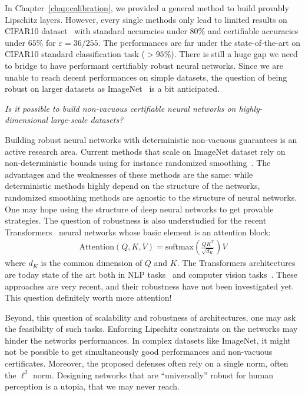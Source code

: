 In Chapter~\ref{chap:calibration}, we provided a general method to build provably Lipschitz layers. However, every single methods only lead to limited results on CIFAR10 dataset~\citep{cifar-10} with standard accuracies under $80\%$ and certifiable accuracies under $65\%$ for $\varepsilon=36/255$. The performances are far under the state-of-the-art on CIFAR10 standard classification task ($>95\%$). There is still a huge gap we need to bridge to have performant certifiably robust neural networks. Since we are unable to reach decent performances on simple datasets, the question of being robust on larger datasets as ImageNet~\citep{imagenet_cvpr09} is a bit anticipated.

\begin{tcolorbox}[colback=grund,colframe=rahmen]
    \begin{center}
        \emph{Is it possible to build non-vacuous certifiable neural networks on highly-dimensional large-scale datasets?}   
    \end{center}

\end{tcolorbox}

Building robust neural networks with deterministic non-vacuous guarantees is an active research area. Current methods that scale on ImageNet dataset rely on non-deterministic bounds using for instance randomized smoothing~\citep{KolterRandomizedSmoothing,salman2019provably}. The advantages and the weaknesses of these methods are the same: while deterministic methods highly depend on the structure of the networks, randomized smoothing methods are agnostic to the structure of neural networks. One may hope using the structure of deep neural networks to get provable strategies. The question of robustness is also understudied for the recent Transformers~\citep{vaswani2017attention} neural networks whose basic element is an attention block:
\begin{align*}
    \text{Attention}(Q,K,V) = \text{softmax}\left(\frac{QK^T}{\sqrt{d_K}}\right)V
\end{align*}
where $d_K$ is the common dimension of $Q$ and $K$. The Transformers architectures are today state of the art both in NLP tasks~\citep{devlin2018bert} and computer vision tasks~\citep{dosovitskiy2020image}. These approaches are very recent, and their robustness have not been investigated yet. This question definitely worth more attention! 


Beyond, this question of scalability and robustness of architectures, one may ask the feasibility of such tasks. Enforcing Lipschitz constraints on the networks may hinder the networks performances. In complex datasets like ImageNet, it might not be possible to get simultaneously good performances and non-vacuous certificates. Moreover, the proposed defenses often rely on a single norm, often the $\ell^2$ norm. Designing networks that are ``universally'' robust for human perception  is a utopia, that we may never reach.  




